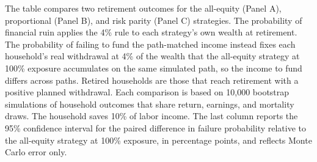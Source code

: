 \begin{table}[p]\centering
\caption{Capital preservation and funding the path-matched income}\label{tab:common}
\begin{minipage}{\linewidth}\small The table compares two retirement outcomes for the all-equity (Panel A), proportional (Panel B), and risk parity (Panel C) strategies. The probability of financial ruin applies the 4\% rule to each strategy's own wealth at retirement. The probability of failing to fund the path-matched income instead fixes each household's real withdrawal at 4\% of the wealth that the all-equity strategy at 100\% exposure accumulates on the same simulated path, so the income to fund differs across paths. Retired households are those that reach retirement with a positive planned withdrawal. Each comparison is based on 10,000 bootstrap simulations of household outcomes that share return, earnings, and mortality draws. The household saves 10\% of labor income. The last column reports the 95\% confidence interval for the paired difference in failure probability relative to the all-equity strategy at 100\% exposure, in percentage points, and reflects Monte Carlo error only.\end{minipage}
\medskip


\end{table}
